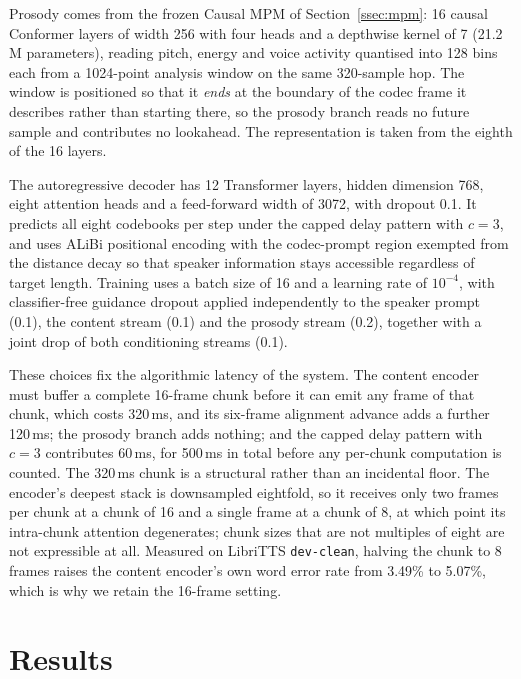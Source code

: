\documentclass{article}
\begin{document}
Prosody comes from the frozen Causal MPM of Section~\ref{ssec:mpm}: 16 causal Conformer layers of width 256 with four heads and a depthwise kernel of 7 (21.2\,M parameters), reading pitch, energy and voice activity quantised into 128 bins each from a 1024-point analysis window on the same 320-sample hop.
The window is positioned so that it \emph{ends} at the boundary of the codec frame it describes rather than starting there, so the prosody branch reads no future sample and contributes no lookahead.
The representation is taken from the eighth of the 16 layers.

The autoregressive decoder has 12 Transformer layers, hidden dimension 768, eight attention heads and a feed-forward width of 3072, with dropout 0.1.
It predicts all eight codebooks per step under the capped delay pattern with $c = 3$, and uses ALiBi positional encoding with the codec-prompt region exempted from the distance decay so that speaker information stays accessible regardless of target length.
Training uses a batch size of 16 and a learning rate of $10^{-4}$, with classifier-free guidance dropout applied independently to the speaker prompt (0.1), the content stream (0.1) and the prosody stream (0.2), together with a joint drop of both conditioning streams (0.1).

These choices fix the algorithmic latency of the system.
The content encoder must buffer a complete 16-frame chunk before it can emit any frame of that chunk, which costs 320\,ms, and its six-frame alignment advance adds a further 120\,ms; the prosody branch adds nothing; and the capped delay pattern with $c = 3$ contributes 60\,ms, for 500\,ms in total before any per-chunk computation is counted.
The 320\,ms chunk is a structural rather than an incidental floor.
The encoder's deepest stack is downsampled eightfold, so it receives only two frames per chunk at a chunk of 16 and a single frame at a chunk of 8, at which point its intra-chunk attention degenerates; chunk sizes that are not multiples of eight are not expressible at all.
Measured on LibriTTS \texttt{dev-clean}, halving the chunk to 8 frames raises the content encoder's own word error rate from 3.49\% to 5.07\%, which is why we retain the 16-frame setting.

\section{Results}
\label{ssec:anon_results}
\end{document}

